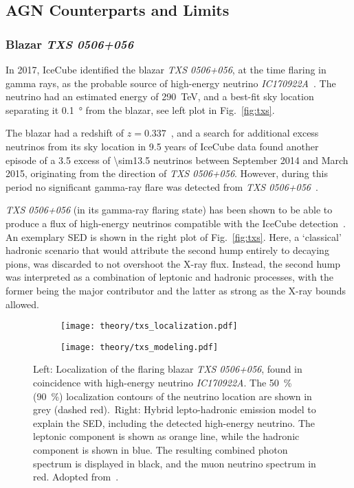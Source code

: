 \subsection{AGN Counterparts and Limits}

\subsubsection{Blazar \emph{TXS 0506+056}}
In 2017, IceCube identified the blazar \emph{TXS 0506+056}, at the time flaring in gamma rays, as the probable source of high-energy neutrino \emph{IC170922A}~. The neutrino had an estimated energy of \SI{290}{\tera\eV}, and a best-fit sky location separating it \SI{0.1}{\degree} from the blazar, see left plot in Fig.~\ref{fig:txs}.

The blazar had a redshift of $z=0.337$~, and a search for additional excess neutrinos from its sky location in 9.5 years of IceCube data found another episode of a \SI{3.5}{\sigma} excess of \num{\sim13.5} neutrinos between September 2014 and March 2015, originating from the direction of \emph{TXS 0506+056}. However, during this period no significant gamma-ray flare was detected from \emph{TXS 0506+056}~.

\emph{TXS 0506+056} (in its gamma-ray flaring state) has been shown to be able to produce a flux of high-energy neutrinos compatible with the IceCube detection~. An exemplary SED is shown in the right plot of Fig.~\ref{fig:txs}. Here, a `classical' hadronic scenario that would attribute the second hump entirely to decaying pions, was discarded to not overshoot the X-ray flux. Instead, the second hump was interpreted as a combination of leptonic and hadronic processes, with the former being the major contributor and the latter as strong as the X-ray bounds allowed.

\begin{figure}[htb]
    \centering
    \begin{subfigure}[b]{0.47\textwidth}
        \centering
        \texttt{[image: theory/txs\_localization.pdf]}
    \end{subfigure}
    \begin{subfigure}[b]{0.52\textwidth}
        \centering
        \texttt{[image: theory/txs\_modeling.pdf]}
    \end{subfigure}
    \caption[\textit{TXS 0506+056}: Localization and SED]{Left: Localization of the flaring blazar \emph{TXS 0506+056}, found in coincidence with high-energy neutrino \emph{IC170922A}. The \SI{50}{\percent} (\SI{90}{\percent}) localization contours of the neutrino location are shown in grey (dashed red).\ Right: Hybrid lepto-hadronic emission model to explain the SED, including the detected high-energy neutrino. The leptonic component is shown as orange line, while the hadronic component is shown in blue. The resulting combined photon spectrum is displayed in black, and the muon neutrino spectrum in red. Adopted from~\cite{Aartsen2018, Gao2018}.}
\end{figure}

